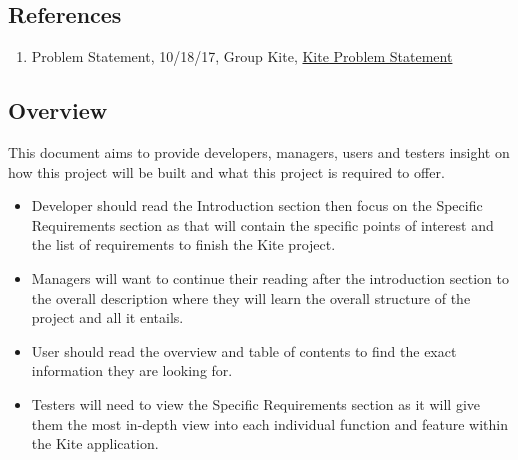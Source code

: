 \documentclass[letterpaper, 10, draftclsnofoot, onecolumn]{IEEEtran}
\begin{document}
\subsection{References}
\begin{enumerate}
\item Problem Statement, 10/18/17, Group Kite, \href{https://github.com/TheEnderPrime/Capstone/tree/master/Documentation/Problem\%20Statement}{Kite Problem Statement}
\end{enumerate}

 

\subsection{Overview}
This document aims to provide developers, managers, users and testers insight on how this project will be built and what this project is required to offer. 
\begin{itemize}
\item Developer should read the Introduction section then focus on the Specific Requirements section as that will contain the specific points of interest and the list of requirements to finish the Kite project.
\item Managers will want to continue their reading after the introduction section to the overall description where they will learn the overall structure of the project and all it entails.
\item User should read the overview and table of contents to find the exact information they are looking for.
\item Testers will need to view the Specific Requirements section as it will give them the most in-depth view into each individual function and feature within the Kite application.
\end{itemize}

\end{document}
